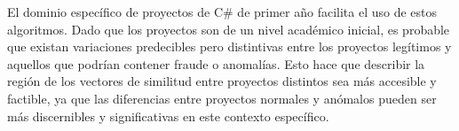 El dominio específico de proyectos de C\# de primer año facilita el uso de estos algoritmos. Dado que los proyectos son de un nivel académico inicial, es probable que existan variaciones predecibles pero distintivas entre los proyectos legítimos y aquellos que podrían contener fraude o anomalías. Esto hace que describir la región de los vectores de similitud entre proyectos distintos sea más accesible y factible, ya que las diferencias entre proyectos normales y anómalos pueden ser más discernibles y significativas en este contexto específico.


